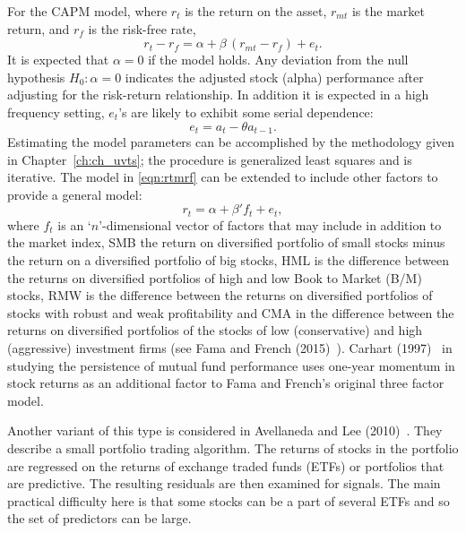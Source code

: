 For the CAPM model, where $r_t$ is the return on the asset, $r_{mt}$ is the market return, and $r_f$ is the risk-free rate,
	\begin{equation} \label{eqn:rtmrf}
	r_t - r_f = \alpha + \beta \,( r_{mt} - r_f ) + e_t.
	\end{equation}
It is expected that $\alpha= 0$ if the model holds. Any deviation from the null hypothesis $H_0: \alpha= 0$ indicates the adjusted stock (alpha) performance after adjusting for the risk-return relationship. In addition it is expected in a high frequency setting, $e_t$'s are likely to exhibit some serial dependence:
	\begin{equation} \label{eqn:et}
	e_t = a_t - \theta a_{t-1}.
	\end{equation}
Estimating the model parameters can be accomplished by the methodology given in Chapter~\ref{ch:ch_uvts}; the procedure is generalized least squares and is iterative. The model in \eqref{eqn:rtmrf} can be extended to include other factors to provide a general model:
	\begin{equation} \label{eqn:rtalpha}
	r_t = \alpha + \beta'f_{t} + e_t,
	\end{equation}
where $f_t$ is an `$n$'-dimensional vector of factors that may include in addition to the market index, SMB the return on diversified portfolio of small stocks minus the return on a diversified portfolio of big stocks, HML is the difference between the returns on diversified portfolios of high and low Book to Market (B/M) stocks, RMW is the difference between the returns on diversified portfolios of stocks with robust and weak profitability and CMA in the difference between the returns on diversified portfolios of the stocks of low (conservative) and high (aggressive) investment firms (see Fama and French (2015)~\cite{fama2015}). Carhart (1997)~\cite{carhart1997persistence} in studying the persistence of mutual fund performance uses one-year momentum in stock returns as an additional factor to Fama and French's original three factor model.


Another variant of this type is considered in Avellaneda and Lee (2010)~\cite{avellee}. They describe a small portfolio trading algorithm. The returns of stocks in the portfolio are regressed on the returns of exchange traded funds (ETFs) or portfolios that are predictive. The resulting residuals are then examined for signals. The main practical difficulty here is that some stocks can be a part of several ETFs and so the set of predictors can be large. 


